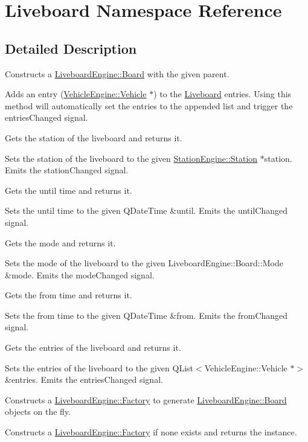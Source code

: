 \hypertarget{namespaceLiveboard}{}\section{Liveboard Namespace Reference}
\label{namespaceLiveboard}


\subsection{Detailed Description}
Constructs a \mbox{\hyperlink{classLiveboardEngine_1_1Board}{Liveboard\+Engine\+::\+Board}} with the given parent.

Adds an entry (\mbox{\hyperlink{classVehicleEngine_1_1Vehicle}{Vehicle\+Engine\+::\+Vehicle}} $\ast$) to the \mbox{\hyperlink{namespaceLiveboard}{Liveboard}} entries. Using this method will automatically set the entries to the appended list and trigger the entries\+Changed signal.

Gets the station of the liveboard and returns it.

Sets the station of the liveboard to the given \mbox{\hyperlink{classStationEngine_1_1Station}{Station\+Engine\+::\+Station}} $\ast$station. Emits the station\+Changed signal.

Gets the until time and returns it.

Sets the until time to the given Q\+Date\+Time \&until. Emits the until\+Changed signal.

Gets the mode and returns it.

Sets the mode of the liveboard to the given Liveboard\+Engine\+::\+Board\+::\+Mode \&mode. Emits the mode\+Changed signal.

Gets the from time and returns it.

Sets the from time to the given Q\+Date\+Time \&from. Emits the from\+Changed signal.

Gets the entries of the liveboard and returns it.

Sets the entries of the liveboard to the given Q\+List$<$\+Vehicle\+Engine\+::\+Vehicle $\ast$$>$ \&entries. Emits the entries\+Changed signal.

Constructs a \mbox{\hyperlink{classLiveboardEngine_1_1Factory}{Liveboard\+Engine\+::\+Factory}} to generate \mbox{\hyperlink{classLiveboardEngine_1_1Board}{Liveboard\+Engine\+::\+Board}} objects on the fly.

Constructs a \mbox{\hyperlink{classLiveboardEngine_1_1Factory}{Liveboard\+Engine\+::\+Factory}} if none exists and returns the instance.

